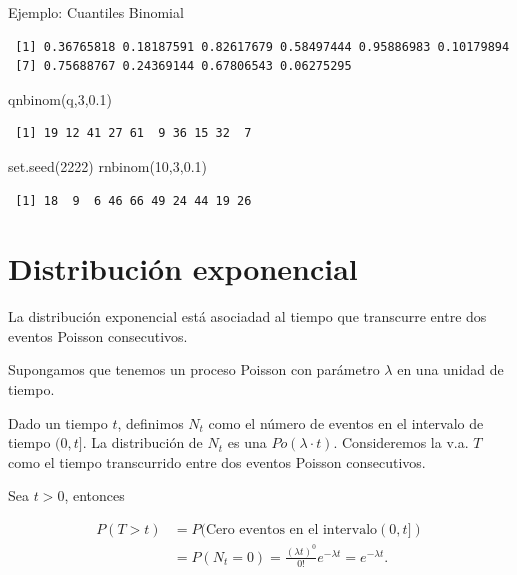 \documentclass[
  letterpaper,
  DIV=11,
  numbers=noendperiod]{scrreprt}
\newenvironment{Shaded}{\begin{snugshade}}{\end{snugshade}}
\newcommand{\DecValTok}[1]{\textcolor[rgb]{0.68,0.00,0.00}{#1}}
\newcommand{\FloatTok}[1]{\textcolor[rgb]{0.68,0.00,0.00}{#1}}
\newcommand{\FunctionTok}[1]{\textcolor[rgb]{0.28,0.35,0.67}{#1}}
\newcommand{\NormalTok}[1]{\textcolor[rgb]{0.00,0.23,0.31}{#1}}
\begin{document}
\begin{Ejemplo}{Ejemplo: Cuantiles Binomial}{}
\begin{verbatim}
 [1] 0.36765818 0.18187591 0.82617679 0.58497444 0.95886983 0.10179894
 [7] 0.75688767 0.24369144 0.67806543 0.06275295
\end{verbatim}

\begin{Shaded}
\begin{Highlighting}[]
\FunctionTok{qnbinom}\NormalTok{(q,}\DecValTok{3}\NormalTok{,}\FloatTok{0.1}\NormalTok{)}
\end{Highlighting}
\end{Shaded}

\begin{verbatim}
 [1] 19 12 41 27 61  9 36 15 32  7
\end{verbatim}

\begin{Shaded}
\begin{Highlighting}[]
\FunctionTok{set.seed}\NormalTok{(}\DecValTok{2222}\NormalTok{)}
\FunctionTok{rnbinom}\NormalTok{(}\DecValTok{10}\NormalTok{,}\DecValTok{3}\NormalTok{,}\FloatTok{0.1}\NormalTok{)}
\end{Highlighting}
\end{Shaded}

\begin{verbatim}
 [1] 18  9  6 46 66 49 24 44 19 26
\end{verbatim}

\end{Ejemplo}

\section{Distribución exponencial}\label{distribuciuxf3n-exponencial}

La distribución exponencial está asociadad al tiempo que transcurre
entre dos eventos Poisson consecutivos.

Supongamos que tenemos un proceso Poisson con parámetro \(\lambda\) en
una unidad de tiempo.

Dado un tiempo \(t\), definimos \(N_{t}\) como el número de eventos en
el intervalo de tiempo \((0,t]\). La distribución de \(N_t\) es una
\(Po(\lambda\cdot t)\). Consideremos la v.a. \(T\) como el tiempo
transcurrido entre dos eventos Poisson consecutivos.

Sea \(t>0\), entonces

\[
\begin{array}{rl}
P(T>t)&=P(\mbox{Cero eventos en el intervalo}(0,t])\\
&=P(N_{t}=0)=
 \frac{(\lambda t)^0}{0!} e^{-\lambda
 t}=e^{-\lambda t}.
\end{array}
\]
\end{document}
